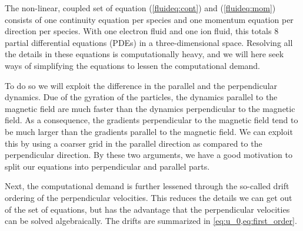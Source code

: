 The non-linear, coupled set of equation (\ref{fluideq:cont}) and (\ref{fluideq:mom}) consists of one continuity equation per species and one momentum equation per direction per species.
With one electron fluid and one ion fluid, this totals $8$ partial differential equations (PDEs) in a three-dimensional space.
Resolving all the details in these equations is computationally heavy, and we will here seek ways of simplifying the equations to lessen the computational demand.

To do so we will exploit the difference in the parallel and the perpendicular dynamics.
Due of the gyration of the particles, the dynamics parallel to the magnetic field are much faster than the dynamics perpendicular to the magnetic field.
As a consequence, the gradients perpendicular to the magnetic field tend to be much larger than the gradients parallel to the magnetic field.
We can exploit this by using a coarser grid in the parallel direction as compared to the perpendicular direction.
By these two arguments, we have a good motivation to split our equations into perpendicular and parallel parts.

Next, the computational demand is further lessened through the so-called drift ordering of the perpendicular velocities.
This reduces the details we can get out of the set of equations, but has the advantage that the perpendicular velocities can be solved algebraically.
The drifts are summarized in \cref{eq:u_0,eq:first_order}.

